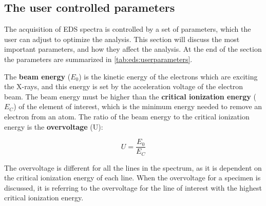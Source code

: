 




























\clearpage



\subsection{The user controlled parameters}
\label{theory:eds:user_controlled_parameters}

The acquisition of EDS spectra is controlled by a set of parameters, which the user can adjust to optimize the analysis.
This section will discuss the most important parameters, and how they affect the analysis.
At the end of the section the parameters are summarized in \cref{tab:eds:userparameters}.

The \textbf{beam energy} ($E_0$) is the kinetic energy of the electrons which are exciting the X-rays, and this energy is set by the acceleration voltage of the electron beam.
The beam energy must be higher than the \textbf{critical ionization energy} ($E_C$) of the element of interest, which is the minimum energy needed to remove an electron from an atom.
The ratio of the beam energy to the critical ionization energy is the \textbf{overvoltage} (U):

\begin{equation}
    U = \frac{E_0}{E_C}
\end{equation}

The overvoltage is different for all the lines in the spectrum, as it is dependent on the critical ionization energy of each line.
When the overvoltage for a specimen is discussed, it is referring to the overvoltage for the line of interest with the highest critical ionization energy.


